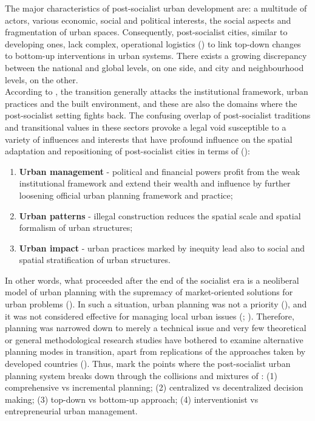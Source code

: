\documentclass[11pt]{report}
\begin{document}
{{{{The major characteristics of post-socialist urban development are: a multitude of actors, various economic, social and political interests, the social aspects and fragmentation of urban spaces.  Consequently, post-socialist cities, similar to developing ones, lack complex, operational logistics (\href{ref}{\citealt{repetti_icts_2010}}) to link top-down changes to bottom-up interventions in urban systems. There exists a growing discrepancy between the national and global levels, on one side, and city and neighbourhood levels, on the other.
\\

According to \href{Sykora}{\cite{sykora_multiple_2012}},
the transition generally attacks the institutional framework, urban practices and the built environment, and these are also the domains where the post-socialist setting fights back.
The confusing overlap of post-socialist traditions and transitional values in these sectors provoke a legal void susceptible to a variety of influences and interests that have profound influence on the spatial adaptation and repositioning of post-socialist cities in terms of (\href{Stanilov}{\citealt{stanilov_post-socialist_2007}}): 

\begin{enumerate}
\item \textbf{Urban management} - political and financial powers profit from the weak institutional framework and extend their wealth and influence by further loosening official urban planning framework and practice; 
\item \textbf{Urban patterns} - illegal construction reduces the spatial scale and spatial formalism of urban structures; 
\item \textbf{Urban impact} - urban practices marked by inequity lead also to social and spatial stratification of urban structures.
\end{enumerate}
 
In other words, what proceeded after the end of the socialist era is a neoliberal model of urban planning with the supremacy of market-oriented solutions for urban problems (\href{Sager}{\citealt{sager_neo-liberal_2011}}).
In such a situation, urban planning was not a priority (\href{Sykora}{\citealt{sykora_transitional_1999}}), and it was not considered effective for managing local urban issues (\href{ref}{\citealt{maier_czech_1998}}; \href{Vujosevic}{\citealt{vujosevic_planning_2006}}).
Therefore, planning was narrowed down to merely a technical issue and very few theoretical or general methodological research studies have bothered to examine alternative planning modes in transition, apart from replications of the approaches taken by developed countries (\href{Begovic}{\citealt{begovic_ekonomika_1995}}).
Thus, \href{Zekovic}{\cite{zekovic_spatial_2015}}
mark the points where the post-socialist urban planning system breaks down through the collisions and mixtures of :
(1) comprehensive vs incremental planning; 
(2) centralized vs decentralized decision making;
(3) top-down vs bottom-up approach;
(4) interventionist vs entrepreneurial urban management.
\\

}}}}
\end{document}
